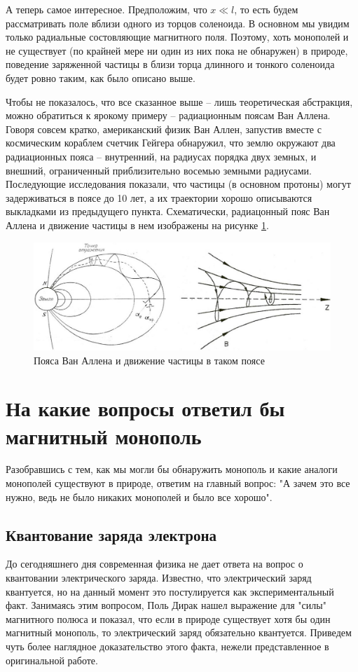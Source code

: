\documentclass[a4paper, 12pt]{article}
\begin{document}
А теперь самое интересное. Предположим, что $x \ll l$, то есть будем рассматривать поле вблизи одного из торцов соленоида. В основном мы увидим только радиальные состовляющие магнитного поля. Поэтому, хоть монополей и не существует (по крайней мере ни один из них пока не обнаружен) в природе, поведение заряженной частицы в близи торца длинного и тонкого соленоида будет ровно таким, как было описано выше.

Чтобы не показалось, что все сказанное выше -- лишь теоретическая абстракция, можно обратиться к ярокому примеру -- радиационным поясам Ван Аллена. Говоря совсем кратко, американский физик Ван Аллен, запустив вместе с космическим кораблем счетчик Гейгера обнаружил, что землю окружают два радиационных пояса -- внутренний, на радиусах порядка двух земных, и внешний, ограниченный приблизительно восемью земными радиусами. Последующие исследования показали, что частицы (в основном протоны) могут задерживаться в поясе до 10 лет, а их траектории хорошо описываются выкладками из предыдущего пункта. Схематически, радиацонный пояс Ван Аллена и движение частицы в нем изображены на рисунке \ref{fig:van_allen_belt}.

\begin{figure}[h]
    \includegraphics[width=\linewidth]{van_allen_belts.jpg}
    \centering
    \caption{Пояса Ван Аллена и движение частицы в таком поясе}
    \label{fig:van_allen_belt}
\end{figure}


\section{На какие вопросы ответил бы магнитный монополь}
Разобравшись с тем, как мы могли бы обнаружить монополь и какие аналоги монополей существуют в природе, ответим на главный вопрос: "А зачем это все нужно, ведь не было никаких монополей и было все хорошо". 

\subsection{Квантование заряда электрона}
До сегодняшнего дня современная физика не дает ответа на вопрос о квантовании электрического заряда. Известно, что электрический заряд квантуется, но на данный момент это постулируется как экспериментальный факт. Занимаясь этим вопросом, Поль Дирак нашел выражение для "силы" магнитного полюса и показал, что если в природе существует хотя бы один магнитный монополь, то электрический заряд обязательно квантуется. Приведем чуть более наглядное доказательство этого факта, нежели представленное в оригинальной работе.
\end{document}
